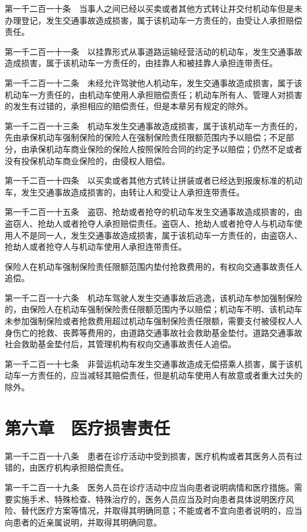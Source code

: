\documentclass[UTF8,12pt,a4paper]{ctexbook}
\begin{document}
第一千二百一十条　当事人之间已经以买卖或者其他方式转让并交付机动车但是未办理登记，发生交通事故造成损害，属于该机动车一方责任的，由受让人承担赔偿责任。

第一千二百一十一条　以挂靠形式从事道路运输经营活动的机动车，发生交通事故造成损害，属于该机动车一方责任的，由挂靠人和被挂靠人承担连带责任。

第一千二百一十二条　未经允许驾驶他人机动车，发生交通事故造成损害，属于该机动车一方责任的，由机动车使用人承担赔偿责任；机动车所有人、管理人对损害的发生有过错的，承担相应的赔偿责任，但是本章另有规定的除外。

第一千二百一十三条　机动车发生交通事故造成损害，属于该机动车一方责任的，先由承保机动车强制保险的保险人在强制保险责任限额范围内予以赔偿；不足部分，由承保机动车商业保险的保险人按照保险合同的约定予以赔偿；仍然不足或者没有投保机动车商业保险的，由侵权人赔偿。

第一千二百一十四条　以买卖或者其他方式转让拼装或者已经达到报废标准的机动车，发生交通事故造成损害的，由转让人和受让人承担连带责任。

第一千二百一十五条　盗窃、抢劫或者抢夺的机动车发生交通事故造成损害的，由盗窃人、抢劫人或者抢夺人承担赔偿责任。盗窃人、抢劫人或者抢夺人与机动车使用人不是同一人，发生交通事故造成损害，属于该机动车一方责任的，由盗窃人、抢劫人或者抢夺人与机动车使用人承担连带责任。

保险人在机动车强制保险责任限额范围内垫付抢救费用的，有权向交通事故责任人追偿。

第一千二百一十六条　机动车驾驶人发生交通事故后逃逸，该机动车参加强制保险的，由保险人在机动车强制保险责任限额范围内予以赔偿；机动车不明、该机动车未参加强制保险或者抢救费用超过机动车强制保险责任限额，需要支付被侵权人人身伤亡的抢救、丧葬等费用的，由道路交通事故社会救助基金垫付。道路交通事故社会救助基金垫付后，其管理机构有权向交通事故责任人追偿。

第一千二百一十七条　非营运机动车发生交通事故造成无偿搭乘人损害，属于该机动车一方责任的，应当减轻其赔偿责任，但是机动车使用人有故意或者重大过失的除外。

\section*{第六章　医疗损害责任}

第一千二百一十八条　患者在诊疗活动中受到损害，医疗机构或者其医务人员有过错的，由医疗机构承担赔偿责任。

第一千二百一十九条　医务人员在诊疗活动中应当向患者说明病情和医疗措施。需要实施手术、特殊检查、特殊治疗的，医务人员应当及时向患者具体说明医疗风险、替代医疗方案等情况，并取得其明确同意；不能或者不宜向患者说明的，应当向患者的近亲属说明，并取得其明确同意。
\end{document}
